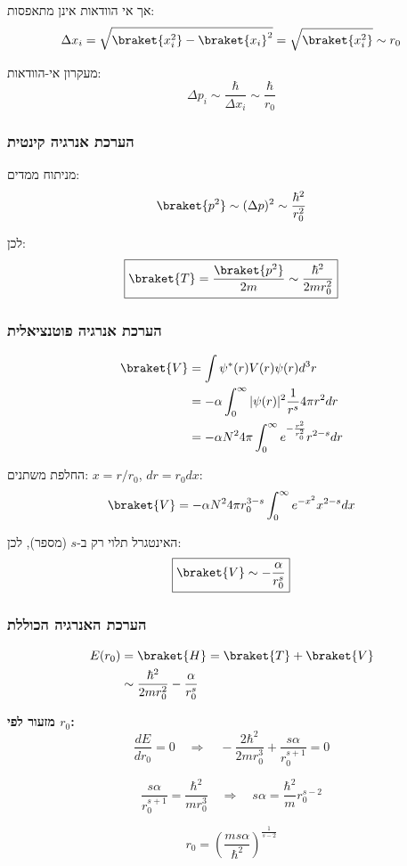 אך אי הוודאות אינן מתאפסות:
\[
\Delta x_i = \sqrt{\braket{x_i^2} - \braket{x_i}^2} = \sqrt{\braket{x_i^2}} \sim r_0
\]

מעקרון אי-הוודאות:
\[
\Delta p_i \sim \frac{\hbar}{\Delta x_i} \sim \frac{\hbar}{r_0}
\]

\subsubsection*{הערכת אנרגיה קינטית}

מניתוח ממדים:
\[
\braket{p^2} \sim (\Delta p)^2 \sim \frac{\hbar^2}{r_0^2}
\]

לכן:
\[
\boxed{\braket{T} = \frac{\braket{p^2}}{2m} \sim \frac{\hbar^2}{2m r_0^2}}
\]

\subsubsection*{הערכת אנרגיה פוטנציאלית}

\begin{align*}
\braket{V} &= \int \psi^*(r) V(r) \psi(r) d^3r \\
&= -\alpha \int_0^{\infty} |\psi(r)|^2 \frac{1}{r^s} 4\pi r^2 dr \\
&= -\alpha N^2 4\pi \int_0^{\infty} e^{-\frac{r^2}{r_0^2}} r^{2-s} dr
\end{align*}

החלפת משתנים: $x = r/r_0$, $dr = r_0 dx$:
\[
\braket{V} = -\alpha N^2 4\pi r_0^{3-s} \int_0^{\infty} e^{-x^2} x^{2-s} dx
\]

האינטגרל תלוי רק ב-$s$ (מספר), לכן:
\[
\boxed{\braket{V} \sim -\frac{\alpha}{r_0^s}}
\]

\subsubsection*{הערכת האנרגיה הכוללת}

\begin{align*}
E(r_0) &= \braket{H} = \braket{T} + \braket{V} \\
&\sim \frac{\hbar^2}{2m r_0^2} - \frac{\alpha}{r_0^s}
\end{align*}

\textbf{מזעור לפי $r_0$:}
\[
\frac{dE}{dr_0} = 0 \quad \Rightarrow \quad -\frac{2\hbar^2}{2m r_0^3} + \frac{s\alpha}{r_0^{s+1}} = 0
\]

\[
\frac{s\alpha}{r_0^{s+1}} = \frac{\hbar^2}{m r_0^3} \quad \Rightarrow \quad s\alpha = \frac{\hbar^2}{m} r_0^{s-2}
\]

\[
\boxed{r_0 = \left(\frac{m s \alpha}{\hbar^2}\right)^{\frac{1}{s-2}}}
\]

